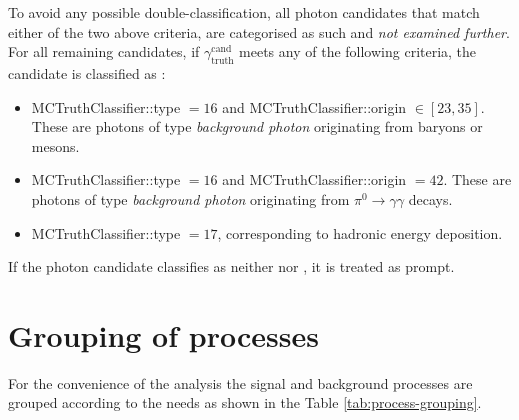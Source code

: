%
To avoid any possible double-classification, all photon candidates that match either of the two above \efake criteria, are categorised as such and \emph{not examined further}.
For all remaining candidates, if $\gamma_{\mathrm{truth}}^{\mathrm{cand}}$ meets any of the following criteria, the candidate is classified as \hfake:
%
\begin{itemize}
\item MCTruthClassifier::type $= 16$ and MCTruthClassifier::origin $\in [23, 35]$.
These are photons of type \emph{background photon} originating from baryons or mesons.
\item MCTruthClassifier::type $= 16$ and MCTruthClassifier::origin $= 42$. These are photons of type \emph{background photon} originating from $\pi^0 \to \gamma\gamma$ decays.
\item MCTruthClassifier::type $= 17$, corresponding to hadronic energy deposition.
\end{itemize}
%
If the photon candidate classifies as neither \efake nor \hfake, it is treated as prompt.


\section{Grouping of processes}

For the convenience of the analysis the signal and background processes are grouped according to the needs as shown in the Table \ref{tab:process-grouping}. 

